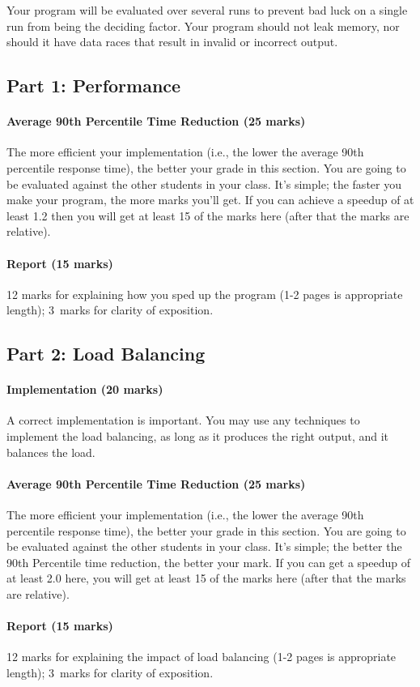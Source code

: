 \documentclass[letterpaper,10pt]{article}
\begin{document}
Your program will be evaluated over several runs to prevent bad luck on a single run from being the deciding factor. Your program should not leak memory, nor should it have data races that result in invalid or incorrect output. 

\subsection*{Part 1: Performance}

\paragraph{Average 90th Percentile Time Reduction (25 marks)} The more efficient your implementation (i.e., the lower the average 90th percentile response time), the better your grade in this section.  You are going to be evaluated against the other students in your class. It's simple; the faster you make your program, the more marks
you'll get. If you can achieve a speedup of at least 1.2 then you will get at least 15 of the marks here (after that the marks are relative).

\paragraph{Report (15 marks)} 12 marks for explaining how you sped up the program (1-2 pages is appropriate length); 3~marks for clarity of exposition.

\subsection*{Part 2: Load Balancing}

\paragraph{Implementation (20 marks)} A correct implementation is important. You may use any techniques to implement the load balancing, as long as it produces the right output, and it balances the load.

\paragraph{Average 90th Percentile Time Reduction (25 marks)} The more efficient your implementation (i.e., the lower the average 90th percentile response time), the better your grade in this section.  You are going to be evaluated against the other students in your class. It's simple; the better the 90th Percentile time reduction, the better your mark. If you can get a speedup of at least 2.0 here, you will get at least 15 of the marks here (after that the marks are relative).

\paragraph{Report (15 marks)} 12 marks for explaining the impact of load balancing (1-2 pages is appropriate length); 3~marks for clarity of exposition.
\end{document}
